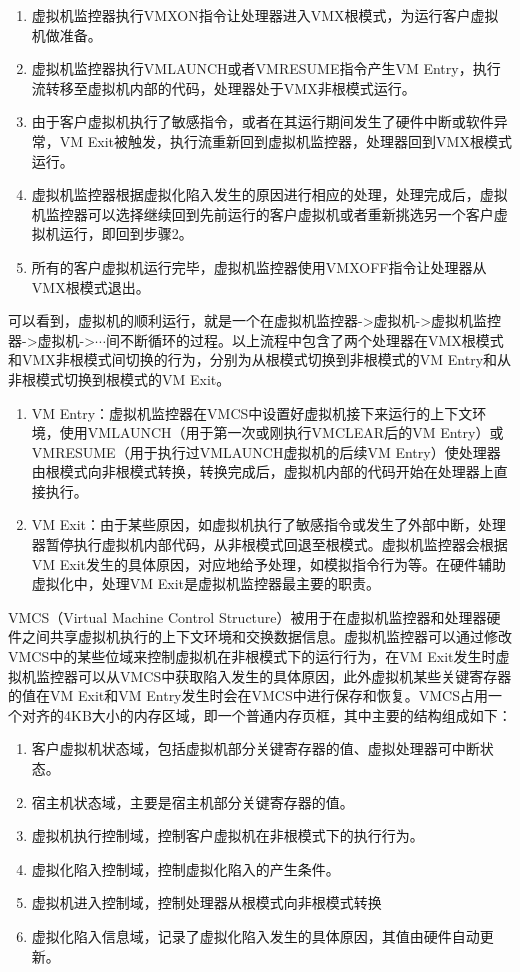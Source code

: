 \begin{enumerate}
\item 虚拟机监控器执行VMXON指令让处理器进入VMX根模式，为运行客户虚拟机做准备。
\item 虚拟机监控器执行VMLAUNCH或者VMRESUME指令产生VM Entry，执行流转移至虚拟机内部的代码，处理器处于VMX非根模式运行。
\item 由于客户虚拟机执行了敏感指令，或者在其运行期间发生了硬件中断或软件异常，VM Exit被触发，执行流重新回到虚拟机监控器，处理器回到VMX根模式运行。
\item 虚拟机监控器根据虚拟化陷入发生的原因进行相应的处理，处理完成后，虚拟机监控器可以选择继续回到先前运行的客户虚拟机或者重新挑选另一个客户虚拟机运行，即回到步骤2。
\item 所有的客户虚拟机运行完毕，虚拟机监控器使用VMXOFF指令让处理器从VMX根模式退出。
\end{enumerate}

可以看到，虚拟机的顺利运行，就是一个在虚拟机监控器->虚拟机->虚拟机监控器->虚拟机->$\cdots$间不断循环的过程。以上流程中包含了两个处理器在VMX根模式和VMX非根模式间切换的行为，分别为从根模式切换到非根模式的VM Entry和从非根模式切换到根模式的VM Exit。

\begin{enumerate}
\item VM Entry：虚拟机监控器在VMCS中设置好虚拟机接下来运行的上下文环境，使用VMLAUNCH（用于第一次或刚执行VMCLEAR后的VM Entry）或VMRESUME（用于执行过VMLAUNCH虚拟机的后续VM Entry）使处理器由根模式向非根模式转换，转换完成后，虚拟机内部的代码开始在处理器上直接执行。
\item VM Exit：由于某些原因，如虚拟机执行了敏感指令或发生了外部中断，处理器暂停执行虚拟机内部代码，从非根模式回退至根模式。虚拟机监控器会根据VM Exit发生的具体原因，对应地给予处理，如模拟指令行为等。在硬件辅助虚拟化中，处理VM Exit是虚拟机监控器最主要的职责。
\end{enumerate}

VMCS（Virtual Machine Control Structure）被用于在虚拟机监控器和处理器硬件之间共享虚拟机执行的上下文环境和交换数据信息。虚拟机监控器可以通过修改VMCS中的某些位域来控制虚拟机在非根模式下的运行行为，在VM Exit发生时虚拟机监控器可以从VMCS中获取陷入发生的具体原因，此外虚拟机某些关键寄存器的值在VM Exit和VM Entry发生时会在VMCS中进行保存和恢复。VMCS占用一个对齐的4KB大小的内存区域，即一个普通内存页框，其中主要的结构组成如下：

\begin{enumerate}
\item 客户虚拟机状态域，包括虚拟机部分关键寄存器的值、虚拟处理器可中断状态。
\item 宿主机状态域，主要是宿主机部分关键寄存器的值。
\item 虚拟机执行控制域，控制客户虚拟机在非根模式下的执行行为。
\item 虚拟化陷入控制域，控制虚拟化陷入的产生条件。
\item 虚拟机进入控制域，控制处理器从根模式向非根模式转换
\item 虚拟化陷入信息域，记录了虚拟化陷入发生的具体原因，其值由硬件自动更新。
\end{enumerate}

